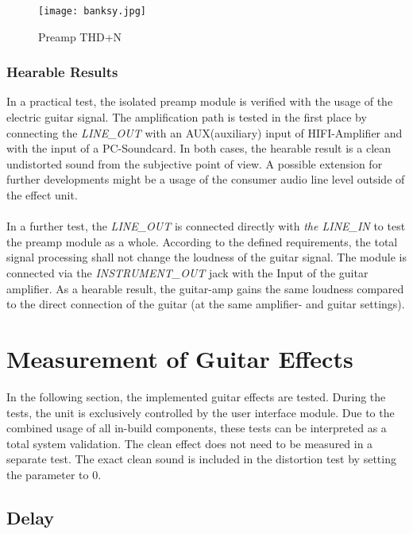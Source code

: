 \begin{figure}[H]
	\centering \texttt{[image: banksy.jpg]}
	\caption[Menu]{Preamp THD+N}
	\label{fig:PreampTHD}
\end{figure}

\subsubsection{Hearable Results}

In a practical test, the isolated preamp module is verified with the usage of the electric guitar signal.
The amplification path is tested in the first place by connecting the \textit{LINE\_OUT} with an AUX(auxiliary) input of HIFI-Amplifier and with the input of a PC-Soundcard. In both cases, the hearable result is a clean undistorted sound from the subjective point of view.
A possible extension for further developments might be a usage of the consumer audio line level outside of the effect unit.\\ 
\\
In a further test, the \textit{LINE\_OUT} is connected directly with \textit{the LINE\_IN} to test the preamp module as a whole.
According to the defined requirements, the total signal processing shall not change the loudness of the guitar signal.
The module is connected via the \textit{INSTRUMENT\_OUT} jack with the Input of the guitar amplifier.
As a hearable result, the guitar-amp gains the same loudness compared to the direct connection of the guitar (at the same amplifier- and guitar settings). 




\section{Measurement of Guitar Effects}

In the following section, the implemented guitar effects are tested.
During the tests, the unit is exclusively controlled by the user interface module.
Due to the combined usage of all in-build components, these tests can be interpreted as a total system validation. The clean effect does not need to be measured in a separate test. The exact clean sound is included in the distortion test by setting the parameter to 0.


\subsection{Delay}

